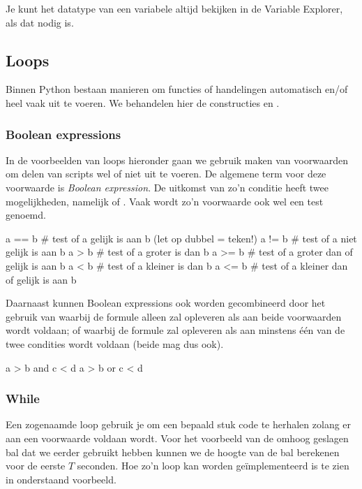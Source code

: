 \documentclass[a4paper,11pt, fleqn]{article}
\begin{document}
Je kunt het datatype van een variabele altijd bekijken in de Variable Explorer, als dat nodig is.

\subsection{Loops}
Binnen Python bestaan manieren om functies of handelingen automatisch en/of heel vaak uit te voeren. We behandelen hier de constructies  en .

\subsubsection{Boolean expressions}
In de voorbeelden van loops hieronder gaan we gebruik maken van voorwaarden om delen van scripts wel of niet uit te voeren. De algemene term voor deze voorwaarde is \textit{Boolean expression}. De uitkomst van zo'n conditie heeft twee mogelijkheden, namelijk  of . Vaak wordt zo'n voorwaarde ook wel een test genoemd.

\begin{python}
a == b	# test of a gelijk is aan b (let op dubbel = teken!)
a != b	# test of a niet gelijk is aan b
a > b	# test of a groter is dan b
a >= b	# test of a groter dan of gelijk is aan b
a < b	# test of a kleiner is dan b
a <= b	# test of a kleiner dan of gelijk is aan b
\end{python}

Daarnaast kunnen Boolean expressions ook worden gecombineerd door het gebruik van  waarbij de formule alleen   zal opleveren als aan beide voorwaarden wordt voldaan; of  waarbij de formule  zal opleveren als aan minstens \'e\'en van de twee condities wordt voldaan (beide mag dus ook).

\begin{python}
a > b and c < d
a > b or c < d
\end{python}

\subsubsection{While}
Een zogenaamde  loop gebruik je om een bepaald stuk code te herhalen zolang er aan een voorwaarde voldaan wordt. Voor het voorbeeld van de omhoog geslagen bal dat we eerder gebruikt hebben kunnen we de hoogte van de bal berekenen voor de eerste $T$ seconden. Hoe zo'n loop kan worden ge\"implementeerd is te zien in onderstaand voorbeeld.
\end{document}
